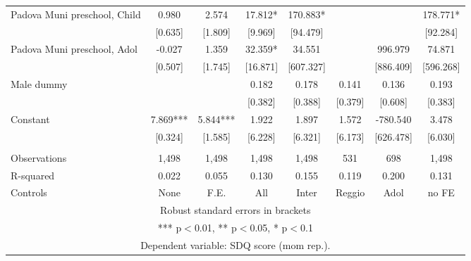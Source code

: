 \begin{tabular}{lccccccc}
Padova Muni preschool, Child & 0.980 & 2.574 & 17.812* & 170.883* &  &  & 178.771* \\
 & [0.635] & [1.809] & [9.969] & [94.479] &  &  & [92.284] \\
Padova Muni preschool, Adol & -0.027 & 1.359 & 32.359* & 34.551 &  & 996.979 & 74.871 \\
 & [0.507] & [1.745] & [16.871] & [607.327] &  & [886.409] & [596.268] \\
Male dummy &  &  & 0.182 & 0.178 & 0.141 & 0.136 & 0.193 \\
 &  &  & [0.382] & [0.388] & [0.379] & [0.608] & [0.383] \\
Constant & 7.869*** & 5.844*** & 1.922 & 1.897 & 1.572 & -780.540 & 3.478 \\
 & [0.324] & [1.585] & [6.228] & [6.321] & [6.173] & [626.478] & [6.030] \\
 &  &  &  &  &  &  &  \\
Observations & 1,498 & 1,498 & 1,498 & 1,498 & 531 & 698 & 1,498 \\
R-squared & 0.022 & 0.055 & 0.130 & 0.155 & 0.119 & 0.200 & 0.131 \\
 Controls & None & F.E. & All & Inter & Reggio & Adol & no FE \\ \hline
\multicolumn{8}{c}{ Robust standard errors in brackets} \\
\multicolumn{8}{c}{ *** p$<$0.01, ** p$<$0.05, * p$<$0.1} \\
\multicolumn{8}{c}{ Dependent variable: SDQ score (mom rep.).} \\
\end{tabular}
